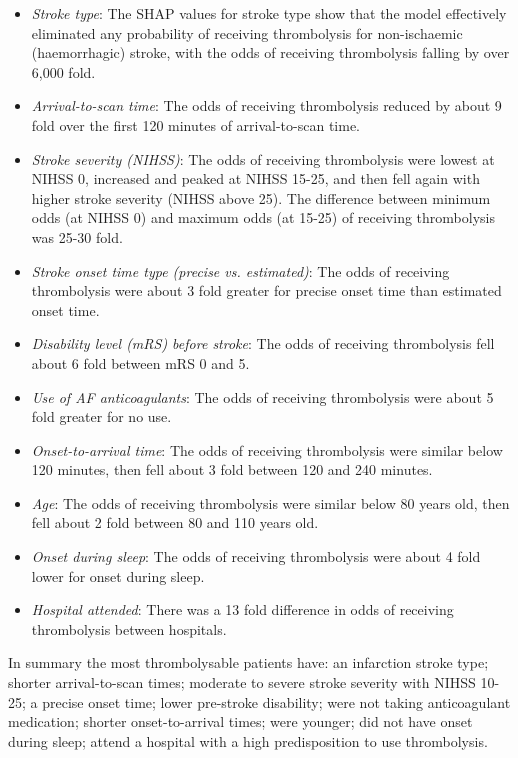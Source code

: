 \begin{itemize}
    \item \emph{Stroke type}: The SHAP values for stroke type show that the model effectively eliminated any probability of receiving thrombolysis for non-ischaemic (haemorrhagic) stroke, with the odds of receiving thrombolysis falling by over 6,000 fold.
    \item \emph{Arrival-to-scan time}: The odds of receiving thrombolysis reduced by about 9 fold over the first 120 minutes of arrival-to-scan time.
    \item \emph{Stroke severity (NIHSS)}: The odds of receiving thrombolysis were lowest at NIHSS 0, increased and peaked at NIHSS 15-25, and then fell again with higher stroke severity (NIHSS above 25). The difference between minimum odds (at NIHSS 0) and maximum odds (at 15-25) of receiving thrombolysis was 25-30 fold.
    \item \emph{Stroke onset time type (precise vs. estimated)}: The odds of receiving thrombolysis were about 3 fold greater for precise onset time than estimated onset time.
    \item \emph{Disability level (mRS) before stroke}: The odds of receiving thrombolysis fell about 6 fold between mRS 0 and 5.
    \item \emph{Use of AF anticoagulants}: The odds of receiving thrombolysis were about 5 fold greater for no use.
    \item \emph{Onset-to-arrival time}: The odds of receiving thrombolysis were similar below 120 minutes, then fell about 3 fold between 120 and 240 minutes.
    \item \emph{Age}: The odds of receiving thrombolysis were similar below 80 years old, then fell about 2 fold between 80 and 110 years old.    
    \item \emph{Onset during sleep}: The odds of receiving thrombolysis were about 4 fold lower for onset during sleep.
    \item \emph{Hospital attended}: There was a 13 fold difference in odds of receiving thrombolysis between hospitals.
\end{itemize}

In summary the most thrombolysable patients have: an infarction stroke type; shorter arrival-to-scan times; moderate to severe stroke severity with NIHSS 10-25; a precise onset time; lower pre-stroke disability; were not taking anticoagulant medication; shorter onset-to-arrival times; were younger; did not have onset during sleep; attend a hospital with a high predisposition to use thrombolysis.


